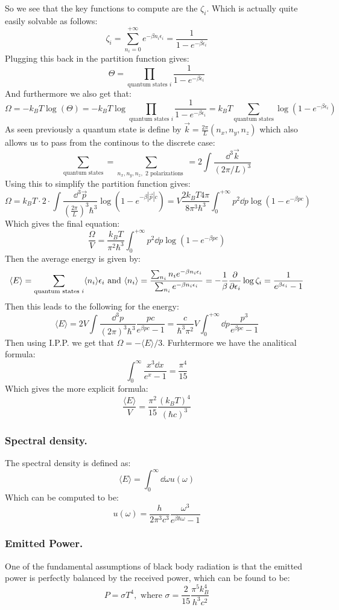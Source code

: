 \documentclass[10pt,a4paper]{book}
\begin{document}
So we see that the key functions to compute are the $\zeta_i$. Which is actually quite easily solvable as follows:
\[
\zeta_i = \sum_{n_i = 0}^{+\infty} e^{-\beta n_i \epsilon_i} = \frac{1}{1 - e^{-\beta \epsilon_i}}
\]
Plugging this back in the partition function gives:
\[
\Theta = \prod_{\text{quantum states } i} \frac{1}{1 - e^{-\beta \epsilon_i}}
\]
And furthermore we also get that:
\[
\Omega = - k_B T \log (\Theta) = - k_B T \log \prod_{\text{quantum states } i} \frac{1}{1 - e^{-\beta \epsilon_i}} = k_B T \sum_{\text{quantum states}} \log (1 - e^{-\beta \epsilon_i})
\]
As seen previously a quantum state is define by $\vec{k} = \frac{2 \pi}{L} (n_x, n_y, n_z)$ which also allows us to pass from the continous to the discrete case:
\[\sum_\text{quantum states} = \sum_{n_x, n_y, n_z, \text{ 2 polarizations } } = 2 \int \frac{\dd^3 \vec{k}}{(2\pi/ L)^3}
\]
Using this to simplify the partition function gives:
\[
\Omega = k_B T \cdot 2 \cdot \int \frac{\dd^3 \vec{p}}{(\frac{2\pi}{L})^3 \hbar^3} \log(1 - e^{-\beta |\vec{p}| c}) = V \frac{2 k_B T 4 \pi}{8 \pi^3 \hbar^3} \int_0^{+\infty}p^2 \dd p \log(1 - e^{-\beta p c})
\]
Which gives the final equation:
\[
\frac{\Omega}{V} = \frac{k_B T}{\pi^2 \hbar^3} \int_0^{+\infty} p^2 \dd p \log(1 - e^{-\beta p c})
\]
Then the average energy is given by:
\[
\langle E \rangle = \sum_{\text{quantum states } i} \langle n_i \rangle \epsilon_i \text{ and } \langle n_i \rangle = \frac{\sum_{n_i} n_i e^{-\beta n_i \epsilon_i}}{\sum_{n_i} e^{-\beta n_i \epsilon_i}} = -\frac{1}{\beta} \pdv{}{\epsilon_i} \log \zeta_i =  \frac{1}{e^{\beta \epsilon_i} - 1}
\]
Then this leads to the following for the energy:
\[
\langle E \rangle = 2 V \int \frac{\dd^3 p}{(2 \pi)^3 \hbar^3} \frac{pc}{e^{\beta pc} - 1} = \frac{c}{\hbar^3 \pi^2} V \int_0^{+\infty} \dd p \frac{p^3}{e^{\beta p c} - 1} 
\]
Then using I.P.P. we get that $\Omega = - \langle E \rangle / 3$. Furhtermore we have the analitical formula:
\[
\int_0^\infty \frac{x^3 \dd x} {e^x - 1} = \frac{\pi^4}{15}
\]
Which gives the more explicit formula:
\[
\frac{\langle E \rangle}{V} = \frac{\pi^2}{15} \frac{(k_B T)^4}{(\hbar c)^3}
\]
\subsubsection{Spectral density.}
The spectral density is defined as:
\[
\langle E \rangle = \int_0^\infty \dd \omega u(\omega)
\]
Which can be computed to be:
\[
u(\omega) = \frac{h}{2\pi^3 c^3} \frac{\omega^3}{e^{\beta \hbar \omega} - 1}
\]

\subsubsection{Emitted Power.}
One of the fundamental assumptions of black body radiation is that the emitted power is perfectly balanced by the received power, which can be found to be:
\[
P = \sigma T^4 , \text{ where } \sigma = \frac{2}{15} \frac{\pi^5 k_B^4}{h^3 c^2}
\]
\end{document}
